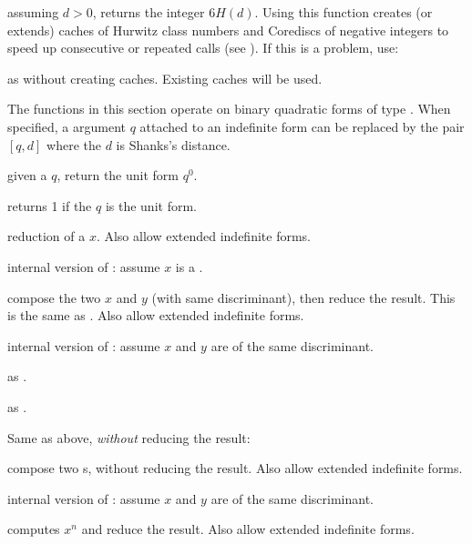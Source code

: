  assuming $d > 0$, returns the integer $6
H(d)$. Using this function creates (or extends) caches of Hurwitz class
numbers and Corediscs of negative integers to speed up consecutive or
repeated calls (see ). If this is a problem, use:

 as  without
creating caches. Existing caches will be used.


The functions in this section operate on binary quadratic forms of type
. When specified, a  argument $q$ attached to an
indefinite form can be replaced by the pair $[q, d]$ where the 
$d$ is Shanks's distance.

 given a  $q$, return the unit form $q^0$.

 returns 1 if the 
$q$ is the unit form.


 reduction of a  $x$. Also allow extended
indefinite forms.

 internal version of : assume $x$
is a .


 compose the two  $x$ and $y$ (with
same discriminant), then reduce the result. This is the same as
. Also allow extended indefinite forms.

 internal version of : assume
$x$ and $y$ are  of the same discriminant.

 as .

 as .

\noindent Same as above, \emph{without} reducing the result:

 compose two s,
without reducing the result. Also allow extended indefinite forms.

 internal version of :
assume $x$ and $y$ are  of the same discriminant.


 computes $x^n$ and reduce the result. Also
allow extended indefinite forms.

